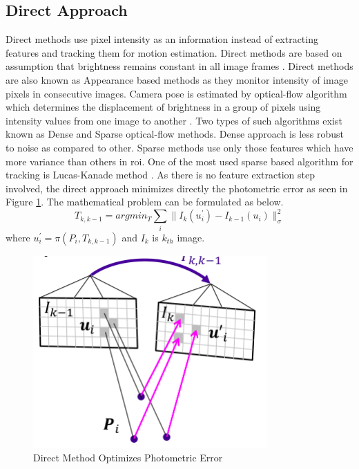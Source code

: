\subsection{Direct Approach}
\label{direct}
Direct methods use pixel intensity as an information instead of extracting features and tracking them for motion estimation. Direct methods are based on assumption that brightness remains constant in all image frames \cite{Irani-et-al-1999}. Direct methods are also known as Appearance based methods as they monitor intensity of image pixels in consecutive images. Camera pose is estimated by optical-flow algorithm which determines the displacement of brightness in a group of pixels using intensity values from one image to another \cite{Aqel-et-al-2016}. Two types of such algorithms exist known as Dense and Sparse optical-flow methods. Dense approach is less robust to noise as compared to other. Sparse methods use only those features which have more variance than others in \acrshort{roi}. One of the most used sparse based algorithm for tracking is Lucas-Kanade method \cite{Lucas81}. As there is no feature extraction step involved, the direct approach minimizes directly the photometric error as seen in Figure \ref{fig:direct}. The mathematical problem can be formulated as below. 
\begin{equation*}
	T_{k,k-1} = arg min_{T} \sum_{i} \| I_{k}(u^{'}_{i})- I_{k-1}(u_{i})\|^{2}_{\sigma}
\end{equation*}
where $u^{'}_{i} = \pi (P_{i},T_{k,k-1})$ and $I_{k} $ is  $k_{th}$ image.
\newline
\begin{figure}[h]
	\centering
	\includegraphics[width=0.8\textwidth]{direct}
	\caption{Direct Method Optimizes Photometric Error \cite{lecture}}
	\label{fig:direct}
\end{figure}
